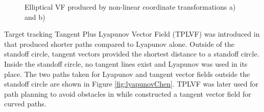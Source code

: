 \documentclass[numbered,pdftex]{ohio-etd}
\begin{document}
\begin{figure}[h]
	\begin{subfigmatrix}{2}%
		\centering
	\end{subfigmatrix}
	\caption{Elliptical VF produced by non-linear coordinate transformations a)\cite{frew_cooperative_2007} and b) \cite{frew_lyapunov_nodate}}
	\label{fig:lyapunovFrew}
\end{figure}

Target tracking Tangent Plus Lyapunov Vector Field (TPLVF) was introduced in \cite{chen_tracking_2009} that produced shorter paths compared to Lyapunov alone. Outside of the standoff circle, tangent vectors provided the shortest distance to a standoff circle. Inside the standoff circle, no tangent lines exist and Lyapunov was used in its place. The two paths taken for Lyapunov and tangent vector fields outside the standoff circle are shown in Figure \ref{fig:lyapunovChen}. TPLVF was later used for path planning to avoid obstacles in \cite{chen_uav_2013} while \cite{liang_tangent_2017} constructed a tangent vector field for curved paths.
\end{document}
